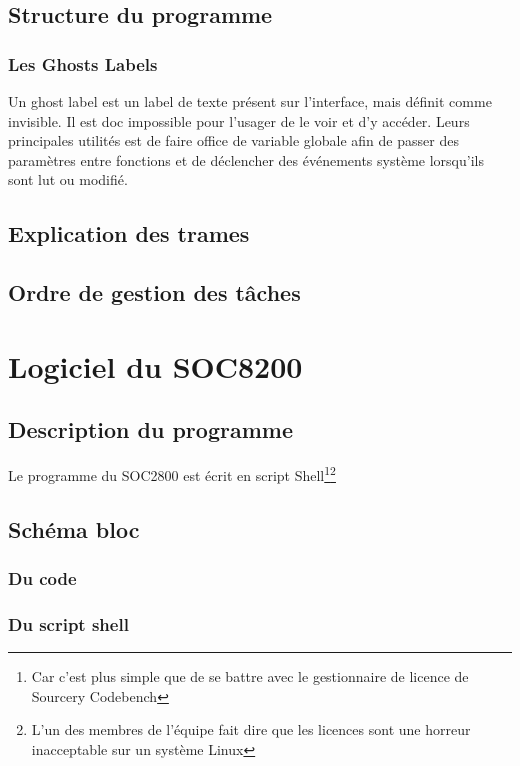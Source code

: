 \documentclass[10pt,a4paper,final]{article}
\begin{document}
\begin{spacing}{1.5}



\subsection{Structure du programme}
\subsubsection{Les Ghosts Labels}
Un ghost label est un label de texte présent sur l'interface, mais définit comme invisible. Il est doc impossible pour l'usager de le voir et d'y accéder. Leurs principales utilités est de faire office de variable globale afin de passer des paramètres entre fonctions et de déclencher des événements système lorsqu'ils sont lut ou modifié.


\subsection{Explication des trames}

\subsection{Ordre de gestion des tâches}





\pagebreak
\section{Logiciel du SOC8200}
\subsection{Description du programme}
Le programme du SOC2800 est écrit en script Shell\footnote{Car c'est plus simple que de se battre avec le gestionnaire de licence de Sourcery Codebench}\footnote{L'un des membres de l'équipe fait dire que les licences sont une horreur inacceptable sur un système Linux}

\subsection{Schéma bloc}
\subsubsection{Du code}

\subsubsection{Du script shell}


\end{spacing}
\end{document}

